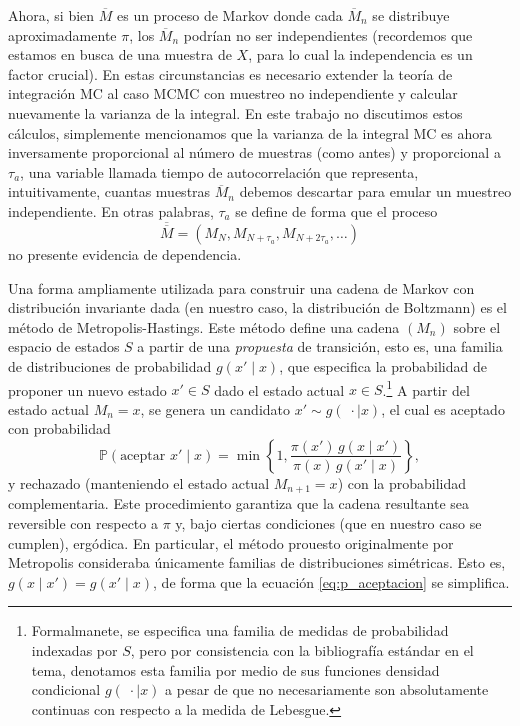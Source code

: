 \documentclass[a4paper,12pt]{article}
\renewcommand{\P}{\mathbb{P}}
\begin{document}
\newpage

Ahora, si bien $\overline{M}$ es un proceso de Markov donde cada $\overline{M}_n$ se distribuye aproximadamente $\pi$, los $\overline{M}_n$ podrían no ser independientes (recordemos que estamos en busca de una muestra de $X$, para lo cual la independencia es un factor crucial). En estas circunstancias es necesario extender la teoría de integración MC al caso MCMC con muestreo no independiente y calcular nuevamente la varianza de la integral. En este trabajo no discutimos estos cálculos, simplemente mencionamos que la varianza de la integral MC es ahora inversamente proporcional al número de muestras (como antes) y proporcional a $\tau_a$, una variable llamada tiempo de autocorrelación que representa, intuitivamente, cuantas muestras $\overline{M}_n$ debemos descartar para emular un muestreo independiente. En otras palabras, $\tau_a$ se define de forma que el proceso
\begin{equation*}
    \overline{\overline{M}} = (M_N, M_{N + \tau_a}, M_{N + 2\tau_a}, \dots)
\end{equation*}
no presente evidencia de dependencia.

Una forma ampliamente utilizada para construir una cadena de Markov con distribución invariante dada (en nuestro caso, la distribución de Boltzmann) es el método de Metropolis-Hastings. Este método define una cadena \( (M_n) \) sobre el espacio de estados \( S \) a partir de una \emph{propuesta} de transición, esto es, una familia de distribuciones de probabilidad \( g(x' \mid x) \), que especifica la probabilidad de proponer un nuevo estado \( x' \in S \) dado el estado actual \( x \in S \).\footnote{Formalmanete, se especifica una familia de medidas de probabilidad indexadas por $S$, pero por consistencia con la bibliografía estándar en el tema, denotamos esta familia por medio de sus funciones densidad condicional $g(\; \cdot \mid x)$ a pesar de que no necesariamente son absolutamente continuas con respecto a la medida de Lebesgue.} A partir del estado actual \( M_n = x \), se genera un candidato \( x' \sim g(\; \cdot \mid x) \), el cual es aceptado con probabilidad
\begin{equation}
    \label{eq:p_aceptacion}
    \P(\text{aceptar } x' \mid x) = \min \left\{1, \frac{\pi(x')\, g(x \mid x')}{\pi(x)\, g(x' \mid x)} \right\},
\end{equation}
y rechazado (manteniendo el estado actual \( M_{n+1} = x \)) con la probabilidad complementaria. Este procedimiento garantiza que la cadena resultante sea reversible con respecto a \( \pi \) y, bajo ciertas condiciones (que en nuestro caso se cumplen), ergódica. En particular, el método prouesto originalmente por Metropolis consideraba únicamente familias de distribuciones simétricas. Esto es, $g(x \mid x') = g(x' \mid x)$, de forma que la ecuación \eqref{eq:p_aceptacion} se simplifica.
\end{document}
